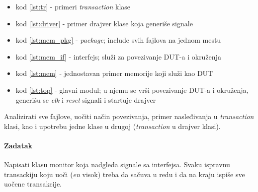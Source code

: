 \begin{itemize}
\item kod \ref{lst:tr} - primeri \emph{transaction} klase
\item kod \ref{lst:driver} - primer drajver klase koja generiše signale
\item kod \ref{lst:mem_pkg} - \emph{package}; include svih fajlova na jednom mestu
\item kod \ref{lst:mem_if} - interfejs; služi za povezivanje DUT-a i okruženja
\item kod \ref{lst:mem} - jednostavan primer memorije koji služi kao DUT
\item kod \ref{lst:top} - glavni modul; u njemu se vrši povezivanje DUT-a i
  okruženja, generišu se \emph{clk} i \emph{reset} signali i startuje drajver

\end{itemize}

Analizirati sve fajlove, uočiti način povezivanja, primer nasleđivanja u
\emph{transaction} klasi, kao i upotrebu jedne klase u drugoj
(\emph{transaction} u drajver klasi).









\paragraph{Zadatak}

Napisati klasu monitor koja nadgleda signale sa interfejsa. Svaku ispravnu
transackiju koju uoči (\emph{en} visok) treba da sačuva u redu i da na kraju ispiše
sve uočene transakcije.

